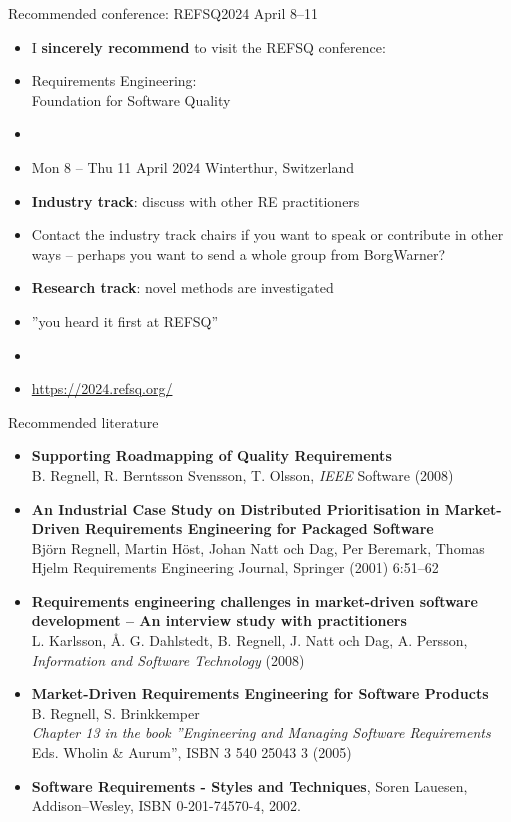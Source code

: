 \documentclass{simpleslides}
\begin{document}
\begin{frame}[fragile]{Recommended conference: REFSQ2024 April 8--11}
\begin{itemize}
\item I \textbf{sincerely recommend} to visit the REFSQ conference:
\item[] Requirements Engineering:\\Foundation for Software Quality
\item[] 
\item Mon 8 -- Thu 11 April 2024 Winterthur, Switzerland 
\item \textbf{Industry track}: discuss with other RE practitioners
\item[] Contact the industry track chairs if you want to speak or contribute in other ways -- perhaps you want to send a whole group from BorgWarner?
\item \textbf{Research track}: novel methods are investigated
\item [] ''you heard it first at REFSQ''
\item []
\item   \url{https://2024.refsq.org/}
\end{itemize}

\end{frame}

\begin{frame}[fragile]{Recommended literature}
\begin{itemize}\footnotesize%
\item \textbf{Supporting Roadmapping of Quality Requirements} \\ B. Regnell, R. Berntsson Svensson, T. Olsson, \emph{IEEE} Software (2008) 
\item \textbf{An Industrial Case Study on Distributed Prioritisation in Market-Driven Requirements Engineering for Packaged Software}\\ 
Björn Regnell, Martin Höst, Johan Natt och Dag, Per Beremark, Thomas Hjelm
Requirements Engineering Journal, Springer (2001) 6:51–62
\item \textbf{Requirements engineering challenges in market-driven software development -- An interview study with practitioners} \\ L. Karlsson, Å. G. Dahlstedt, B. Regnell, J. Natt och Dag, A. Persson, \emph{Information and Software Technology} (2008) 
\item \textbf{Market-Driven Requirements Engineering for Software Products} \\ B. Regnell, S. Brinkkemper \\ \emph{Chapter 13 in the book ''Engineering and Managing Software Requirements} Eds. Wholin \& Aurum'',  ISBN 3 540 25043 3 (2005)
\item \textbf{Software Requirements - Styles and Techniques}, Soren Lauesen, Addison--Wesley, ISBN 0-201-74570-4, 2002.
\end{itemize}
\end{frame}
\end{document}
